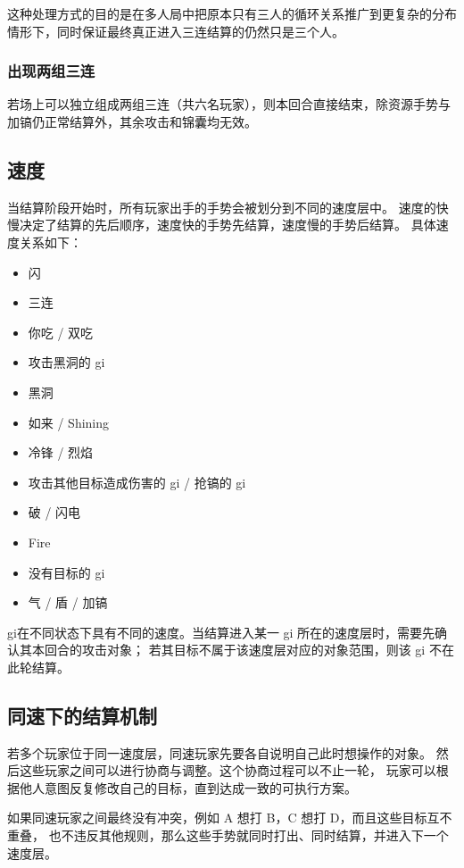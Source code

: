 \documentclass[12pt]{ctexart}
\begin{document}
这种处理方式的目的是在多人局中把原本只有三人的循环关系推广到更复杂的分布情形下，同时保证最终真正进入三连结算的仍然只是三个人。

\subsubsection{出现两组三连}

若场上可以独立组成两组三连（共六名玩家），则本回合直接结束，除资源手势与加镐仍正常结算外，其余攻击和锦囊均无效。

\subsection{速度}

当结算阶段开始时，所有玩家出手的手势会被划分到不同的速度层中。
速度的快慢决定了结算的先后顺序，速度快的手势先结算，速度慢的手势后结算。
具体速度关系如下：

\begin{itemize}
    \item 闪
    \item 三连
    \item 你吃 / 双吃
    \item 攻击黑洞的 gi
    \item 黑洞
    \item 如来 / Shining
    \item 冷锋 / 烈焰
    \item 攻击其他目标造成伤害的 gi / 抢镐的 gi
    \item 破 / 闪电
    \item Fire
    \item 没有目标的 gi
    \item 气 / 盾 / 加镐
\end{itemize}

gi在不同状态下具有不同的速度。当结算进入某一 gi 所在的速度层时，需要先确认其本回合的攻击对象；
若其目标不属于该速度层对应的对象范围，则该 gi 不在此轮结算。

\subsection{同速下的结算机制}

若多个玩家位于同一速度层，同速玩家先要各自说明自己此时想操作的对象。
然后这些玩家之间可以进行协商与调整。这个协商过程可以不止一轮，
玩家可以根据他人意图反复修改自己的目标，直到达成一致的可执行方案。

如果同速玩家之间最终没有冲突，例如 A 想打 B，C 想打 D，而且这些目标互不重叠，
也不违反其他规则，那么这些手势就同时打出、同时结算，并进入下一个速度层。
\end{document}
